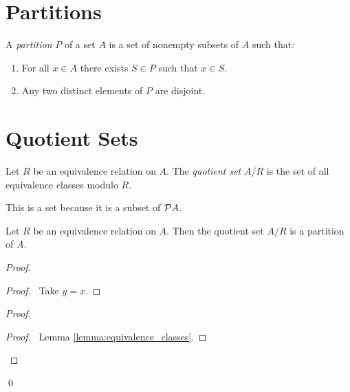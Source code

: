 \section{Partitions}

\begin{definition}[Partition]
    A \emph{partition} $P$ of a set $A$ is a set of nonempty subsets of $A$ such that:
    \begin{enumerate}
        \item For all $x \in A$ there exists $S \in P$ such that $x \in S$.
        \item Any two distinct elements of $P$ are disjoint.
    \end{enumerate}
\end{definition}

\section{Quotient Sets}

\begin{definition}
    Let $R$ be an equivalence relation on $A$. The \emph{quotient set} $A / R$
    is the set of all equivalence classes modulo $R$.

    This is a set because it is a subset of $\mathcal{P} A$.
\end{definition}

\begin{theorem}
    Let $R$ be an equivalence relation on $A$. Then the quotient set $A / R$
    is a partition of $A$.
\end{theorem}

\begin{proof}
    \pf
    \begin{proof}
        \pf\ Take $y = x$.
    \end{proof}
    \begin{proof}
        \begin{proof}
            \pf\ Lemma \ref{lemma:equivalence_classes}.
        \end{proof}
    \end{proof}
    \qed
\end{proof}

